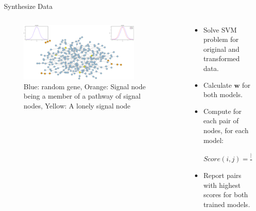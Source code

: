 \documentclass[final]{beamer} %
\begin{document}
\begin{frame}{}
\begin{block}{Synthesize Data}
\begin{columns}
        \begin{column}{0.3\textwidth}
          \begin{figure}
            \includegraphics[width=0.8\textwidth]{synthesized-1slide}
            \caption{\tiny{{\color{blue}Blue}: random gene, {\color{orange}Orange}: Signal node being a member of a pathway of signal nodes, {\color{yellow}Yellow}: A lonely signal node}}
          \end{figure}
        \end{column}

        \begin{column}{0.3\textwidth}
          \begin{itemize}
          \item Solve SVM problem for original and transformed data.
          \item Calculate $\mathbf{w}$ for both models.
          \item Compute for each pair of nodes, for each model: 
            \begin{block}{}
              $Score(i, j) = \frac{|w_i| + |w_j|}{2} \times e^{max\left(d_G(i, j), 1\right)}$
            \end{block}
          \item Report pairs with highest scores for both trained models.
          \end{itemize}
        \end{column}
      \end{columns}
    \end{block}


\end{frame}
\end{document}

